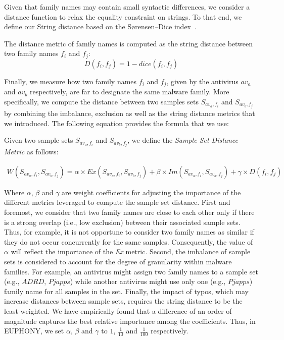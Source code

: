 Given that family names may contain small syntactic differences, we consider a distance function to relax the equality constraint on strings.
To that end, we define our String distance based on the Sørensen–Dice index~\cite{dice_measures_1945}.

\begin{definition}
	The distance metric of family names is computed as the string distance between two family names $f_i$ and $f_j$:
	\begin{equation}
		D(f_i, f_j) = 1 - dice(f_i, f_j)
	\end{equation}
\end{definition}

Finally, we measure how two family names $f_i$ and $f_j$, given by the antivirus $av_a$ and $av_b$ respectively, are far to designate the same malware family.
More specifically, we compute the distance between two samples sets $S_{av_a,f_i}$ and $S_{av_b,f_j}$ by combining the imbalance, exclusion as well as the string distance metrics that we introduced.
The following equation provides the formula that we use:

\begin{definition}
	Given two sample sets $S_{av_a,f_i}$ and $S_{av_b,f_j}$, we define the \emph{Sample Set Distance Metric} as follows:

	\begin{multline}
		W(S_{av_a,f_i}, S_{av_b,f_j}) =\alpha \times Ex(S_{av_a,f_i}, S_{av_b,f_j}) + \beta \times Im(S_{av_a,f_i}, S_{av_b,f_j}) + \gamma \label{eq:weight} \times D(f_i, f_j)
	\end{multline}
\end{definition}

Where $\alpha$, $\beta$ and $\gamma$ are weight coefficients for adjusting the importance of the different metrics leveraged to compute the sample set distance.
First and foremost, we consider that two family names are close to each other only if there is a strong overlap (i.e., low exclusion) between their associated sample sets.
Thus, for example, it is not opportune to consider two family names as similar if they do not occur concurrently for the same samples.
Consequently, the value of $\alpha$ will reflect the importance of the {\em Ex} metric.
Second, the imbalance of sample sets is considered to account for the degree of granularity within malware families.
For example, an antivirus might assign two family names to a sample set (e.g., $ADRD$, $Pjapps$) while another antivirus might use only one (e.g., $Pjapps$) family name for all samples in the set.
Finally, the impact of typos, which may increase distances between sample sets, requires the string distance to be the least weighted.
We have empirically found that a difference of an order of magnitude captures the best relative importance among the coefficients.
Thus, in EUPHONY, we set $\alpha$, $\beta$ and $\gamma$ to $1$, $\frac{1}{10}$ and $\frac{1}{100}$ respectively.
